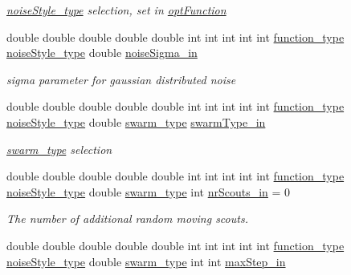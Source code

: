 \begin{CompactItemize}
\begin{CompactList}\small\item\em \hyperlink{optfunctions_8h_b2443d91d959f9b3a033d74864a28862}{noiseStyle\_\-type} selection, set in \hyperlink{classPSO_2e4ade153c87e3ebd19c7e02ce2f8522}{optFunction} \item\end{CompactList}\item 
double double double double double int int int int int \hyperlink{optfunctions_8h_6e6333c061b2073ba9abaaf67e20164b}{function\_\-type} \hyperlink{optfunctions_8h_b2443d91d959f9b3a033d74864a28862}{noiseStyle\_\-type} double \hyperlink{classPSO_bd89c0b6a62d591215f8660ecbcc7fcf}{noiseSigma\_\-in}
\begin{CompactList}\small\item\em sigma parameter for gaussian distributed noise \item\end{CompactList}\item 
double double double double double int int int int int \hyperlink{optfunctions_8h_6e6333c061b2073ba9abaaf67e20164b}{function\_\-type} \hyperlink{optfunctions_8h_b2443d91d959f9b3a033d74864a28862}{noiseStyle\_\-type} double \hyperlink{pso_8h_42bcedc2c7cf9459c9669f9df4f61ebd}{swarm\_\-type} \hyperlink{classPSO_81b27d7f9fd7ecf507e35e202487161e}{swarmType\_\-in}
\begin{CompactList}\small\item\em \hyperlink{pso_8h_42bcedc2c7cf9459c9669f9df4f61ebd}{swarm\_\-type} selection \item\end{CompactList}\item 
double double double double double int int int int int \hyperlink{optfunctions_8h_6e6333c061b2073ba9abaaf67e20164b}{function\_\-type} \hyperlink{optfunctions_8h_b2443d91d959f9b3a033d74864a28862}{noiseStyle\_\-type} double \hyperlink{pso_8h_42bcedc2c7cf9459c9669f9df4f61ebd}{swarm\_\-type} int \hyperlink{classPSO_4441f878ff6f5bcc7b0b75245561a693}{nrScouts\_\-in} = 0
\begin{CompactList}\small\item\em The number of additional random moving scouts. \item\end{CompactList}\item 
double double double double double int int int int int \hyperlink{optfunctions_8h_6e6333c061b2073ba9abaaf67e20164b}{function\_\-type} \hyperlink{optfunctions_8h_b2443d91d959f9b3a033d74864a28862}{noiseStyle\_\-type} double \hyperlink{pso_8h_42bcedc2c7cf9459c9669f9df4f61ebd}{swarm\_\-type} int int \hyperlink{classPSO_6fd804144f0c462b022940a0713780c8}{maxStep\_\-in}

\end{CompactItemize}
